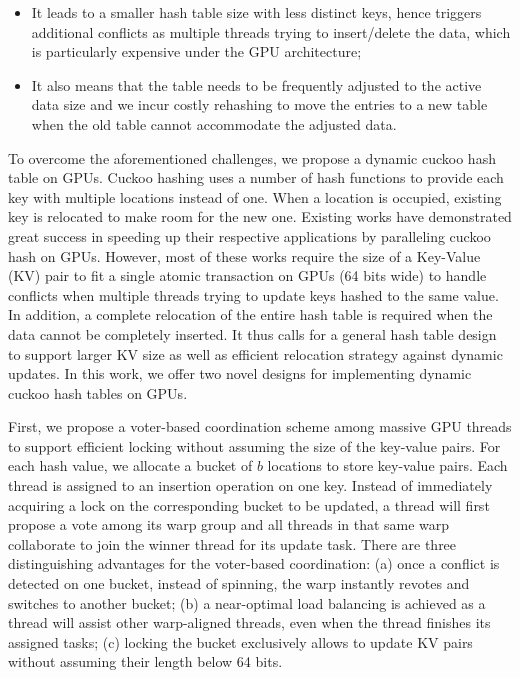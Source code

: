 \begin{itemize}
	\item It leads to a smaller hash table size with less distinct keys, hence triggers additional conflicts as multiple threads trying to insert/delete the data, which is particularly expensive under the GPU architecture;
	\item It also means that the table needs to be frequently adjusted to the active data size and we incur costly rehashing to move the entries to a new table when the old table cannot accommodate the adjusted data. 
\end{itemize}

To overcome the aforementioned challenges, we propose a dynamic cuckoo hash table on GPUs. Cuckoo hashing \cite{pagh2004cuckoo} uses a number of hash functions to provide each key with multiple locations instead of one. When a location is occupied, existing key is relocated to make room for the new one. Existing works \cite{alcantara2009real,alcantara2011building,zhang2015mega,breslow2016horton} have demonstrated great success in speeding up their respective applications by paralleling cuckoo hash on GPUs. 
However, most of these works require the size of a Key-Value (KV) pair to fit a single atomic transaction on GPUs (64 bits wide) to handle conflicts when multiple threads trying to update keys hashed to the same value.
In addition, a complete relocation of the entire hash table is required when the data cannot be completely inserted. 
It thus calls for a general hash table design to support larger KV size as well as efficient relocation strategy against dynamic updates.
In this work, we offer two novel designs for implementing dynamic cuckoo hash tables on GPUs. 

First, we propose a voter-based coordination scheme among massive GPU threads to support efficient locking without assuming the size of the key-value pairs.
For each hash value, we allocate a bucket of $b$ locations to store key-value pairs. 
Each thread is assigned to an insertion operation on one key. Instead of immediately acquiring a lock on the corresponding bucket to be updated, a thread will first propose a vote among its warp group and all threads in that same warp collaborate to join the winner thread for its update task. There are three distinguishing advantages for the voter-based coordination: (a) once a conflict is detected on one bucket, instead of spinning, the warp instantly revotes and switches to another bucket; (b) a near-optimal load balancing is achieved as a thread will assist other warp-aligned threads, even when the thread finishes its assigned tasks; (c) locking the bucket exclusively allows to update KV pairs without assuming their length below 64 bits.

